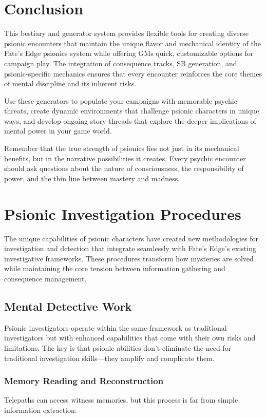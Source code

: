 \documentclass[11pt,twoside]{article}
\begin{document}
\section*{Conclusion}

This bestiary and generator system provides flexible tools for creating diverse psionic encounters that maintain the unique flavor and mechanical identity of the Fate's Edge psionics system while offering GMs quick, customizable options for campaign play. The integration of consequence tracks, SB generation, and psionic-specific mechanics ensures that every encounter reinforces the core themes of mental discipline and its inherent risks.

Use these generators to populate your campaigns with memorable psychic threats, create dynamic environments that challenge psionic characters in unique ways, and develop ongoing story threads that explore the deeper implications of mental power in your game world.

Remember that the true strength of psionics lies not just in its mechanical benefits, but in the narrative possibilities it creates. Every psychic encounter should ask questions about the nature of consciousness, the responsibility of power, and the thin line between mastery and madness.

\section{Psionic Investigation Procedures}

The unique capabilities of psionic characters have created new methodologies for investigation and detection that integrate seamlessly with Fate's Edge's existing investigative frameworks. These procedures transform how mysteries are solved while maintaining the core tension between information gathering and consequence management.

\subsection{Mental Detective Work}

Psionic investigators operate within the same framework as traditional investigators but with enhanced capabilities that come with their own risks and limitations. The key is that psionic abilities don't eliminate the need for traditional investigation skills---they amplify and complicate them.

\subsubsection{Memory Reading and Reconstruction}
Telepaths can access witness memories, but this process is far from simple information extraction:
\end{document}
